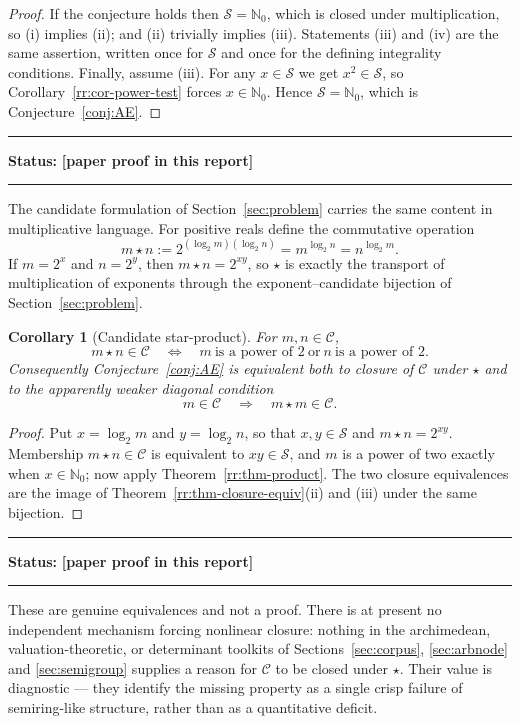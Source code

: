 \documentclass[11pt,oneside]{article}
\newtheorem{corollary}[theorem]{Corollary}
\theoremstyle{definition}
\theoremstyle{remark}
\newcommand{\Nzero}{\mathbb N_0}
\newcommand{\Sol}{\mathcal S}
\newcommand{\Cand}{\mathcal C}
\newcommand{\statusnew}{\textcolor{newgreen}{\textbf{[paper proof in this report]}}}
\newenvironment{statusbox}[1]
{\begin{center}\begin{minipage}{0.94\textwidth}\raggedright\hbadness=10000\hrule
\vspace{0.45em}\textbf{Status:} #1\par\vspace{0.35em}}
{\vspace{0.35em}\hrule\end{minipage}\end{center}}
\begin{document}
\begin{proof}
If the conjecture holds then $\Sol=\Nzero$, which is closed under multiplication, so
(i) implies (ii); and (ii) trivially implies (iii).  Statements (iii) and (iv) are the same
assertion, written once for $\Sol$ and once for the defining integrality conditions.
Finally, assume (iii).  For any $x\in\Sol$ we get $x^2\in\Sol$, so
Corollary~\ref{rr:cor-power-test} forces $x\in\Nzero$.  Hence $\Sol=\Nzero$, which is
Conjecture~\ref{conj:AE}.
\end{proof}

\begin{statusbox}{\statusnew}
\end{statusbox}

The candidate formulation of Section~\ref{sec:problem} carries the same content in
multiplicative language.  For positive reals define the commutative operation
\begin{equation}
 m\star n
 :=2^{(\log_2m)(\log_2n)}
 =m^{\log_2n}
 =n^{\log_2m} .
 \label{rr:eq-star}
\end{equation}
If $m=2^x$ and $n=2^y$, then $m\star n=2^{xy}$, so $\star$ is exactly the transport of
multiplication of exponents through the exponent--candidate bijection of
Section~\ref{sec:problem}.

\begin{corollary}[Candidate star-product]
\label{rr:cor-star}
For $m,n\in\Cand$,
\[
 m\star n\in\Cand
 \quad\Longleftrightarrow\quad
 m\ \text{is a power of }2
 \ \text{or}\
 n\ \text{is a power of }2 .
\]
Consequently Conjecture~\ref{conj:AE} is equivalent both to closure of $\Cand$ under $\star$
and to the apparently weaker diagonal condition
\[
 m\in\Cand
 \quad\Longrightarrow\quad
 m\star m\in\Cand .
\]
\end{corollary}

\begin{proof}
Put $x=\log_2m$ and $y=\log_2n$, so that $x,y\in\Sol$ and $m\star n=2^{xy}$.  Membership
$m\star n\in\Cand$ is equivalent to $xy\in\Sol$, and $m$ is a power of two exactly when
$x\in\Nzero$; now apply Theorem~\ref{rr:thm-product}.  The two closure equivalences are the
image of Theorem~\ref{rr:thm-closure-equiv}(ii) and (iii) under the same bijection.
\end{proof}

\begin{statusbox}{\statusnew}
\end{statusbox}

These are genuine equivalences and not a proof.  There is at present no independent mechanism
forcing nonlinear closure: nothing in the archimedean, valuation-theoretic, or determinant
toolkits of Sections~\ref{sec:corpus}, \ref{sec:arbnode} and \ref{sec:semigroup} supplies a
reason for $\Cand$ to be closed under $\star$.  Their value is diagnostic --- they identify
the missing property as a single crisp failure of semiring-like structure, rather than as a
quantitative deficit.
\end{document}
